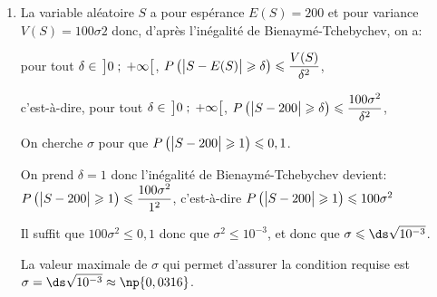 \begin{enumerate}
\begin{enumerate}
$\begin{aligned}[t]
199 < S < 201 
& \iff 199-200 < S - 200 < 201-200
\iff -1 < S-200 < 1\\
& \iff \left | S-200 \strut \right |<1
\end{aligned}$

Donc $P \left ( 199 < S < 201  \right ) = P \left ( \left | S-200 \strut \right |<1\right )$

En prenant l'événement contraire: 

$P \left ( \left | S-200 \strut \right |<1\right ) > 0,9
\iff P \left ( \left |S-200 \strut \right | \geqslant 1 \right ) \leqslant 0,1$

\item%
La variable aléatoire $S$ a pour espérance $E(S)=200$ et pour variance $V(S)=100\sigma2$ donc, d'après l'inégalité de Bienaymé-Tchebychev, on a:

pour tout $\delta\in\, \left ]0\;;\;+\infty\strut \right [$, $P\left ( \left |S-E(S)\strut \right | \geqslant \delta \right ) \leqslant \dfrac{V(S)}{\delta^2}$, 

c'est-à-dire,
pour tout $\delta\in\, \left ]0\;;\;+\infty\strut \right [$, $P\left ( \left |S-200\strut \right | \geqslant \delta \right ) \leqslant \dfrac{100\sigma^2}{\delta^2}$, 

On cherche $\sigma$ pour que
$P \left ( \left |S-200 \strut \right | \geqslant 1 \right ) \leqslant 0,1$.

On prend $\delta=1$ donc l'inégalité de Bienaymé-Tchebychev devient:\\
$P\left ( \left |S-200\strut \right | \geqslant 1 \right ) \leqslant \dfrac{100\sigma^2}{1^2}$, c'est-à-dire
$P\left ( \left |S-200\strut \right | \geqslant 1 \right ) \leqslant 100\sigma^2$

Il suffit  que $100\sigma^2 \leqslant 0,1$ donc que $\sigma^2 \leqslant 10^{-3}$, et donc que $\sigma \leqslant \ds\sqrt{10^{-3}}$.

La valeur maximale de $\sigma$ qui permet d'assurer la condition requise est\\
 $\sigma= \ds \sqrt{10^{-3}}\approx \np{0,0316}$. 
	\end{enumerate}
\end{enumerate}

